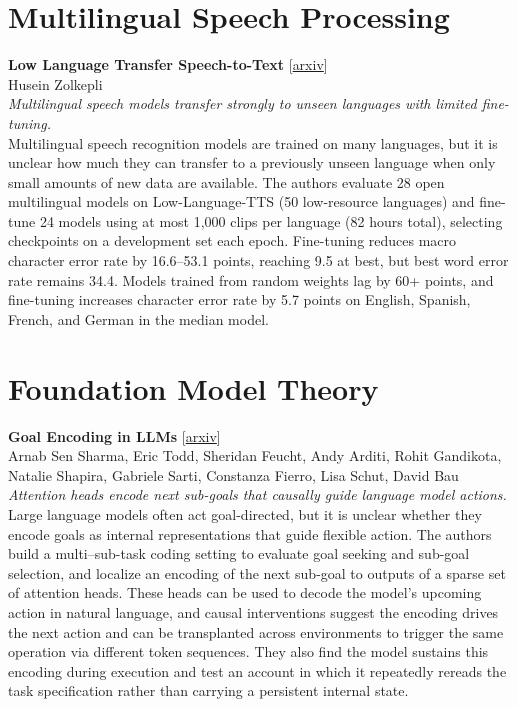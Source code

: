 \documentclass[12pt,letterpaper]{article}
\begin{document}
\medskip
\section*{Multilingual Speech Processing}
\begin{minipage}{\linewidth}
{\small\textbf{Low Language Transfer Speech-to-Text}} {\scriptsize[\href{https://arxiv.org/abs/2611.16260}{arxiv}]}\\
{\scriptsize Husein Zolkepli}\\
{\footnotesize\textit{Multilingual speech models transfer strongly to unseen languages with limited fine-tuning.}}\\[2pt]
{\footnotesize Multilingual speech recognition models are trained on many languages, but it is unclear how much they can transfer to a previously unseen language when only small amounts of new data are available. The authors evaluate 28 open multilingual models on Low-Language-TTS (50 low-resource languages) and fine-tune 24 models using at most 1,000 clips per language (82 hours total), selecting checkpoints on a development set each epoch. Fine-tuning reduces macro character error rate by 16.6--53.1 points, reaching 9.5 at best, but best word error rate remains 34.4. Models trained from random weights lag by 60+ points, and fine-tuning increases character error rate by 5.7 points on English, Spanish, French, and German in the median model.}
\end{minipage}

\medskip
\section*{Foundation Model Theory}
\begin{minipage}{\linewidth}
{\small\textbf{Goal Encoding in LLMs}} {\scriptsize[\href{https://arxiv.org/abs/2611.17297}{arxiv}]}\\
{\scriptsize Arnab Sen Sharma, Eric Todd, Sheridan Feucht, Andy Arditi, Rohit Gandikota, Natalie Shapira, Gabriele Sarti, Constanza Fierro, Lisa Schut, David Bau}\\
{\footnotesize\textit{Attention heads encode next sub-goals that causally guide language model actions.}}\\[2pt]
{\footnotesize Large language models often act goal-directed, but it is unclear whether they encode goals as internal representations that guide flexible action. The authors build a multi--sub-task coding setting to evaluate goal seeking and sub-goal selection, and localize an encoding of the next sub-goal to outputs of a sparse set of attention heads. These heads can be used to decode the model's upcoming action in natural language, and causal interventions suggest the encoding drives the next action and can be transplanted across environments to trigger the same operation via different token sequences. They also find the model sustains this encoding during execution and test an account in which it repeatedly rereads the task specification rather than carrying a persistent internal state.}
\end{minipage}
\end{document}
